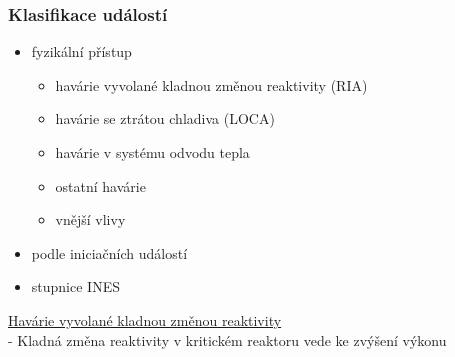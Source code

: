 \begin{comment}
\textit{Asi by bylo dobré zmínit, že hodnocení jaderné bezpečnosti provádíme buď deterministickými nebo pravděpodobnostními hodnoceními} \\

Deterministický přístup:
\begin{itemize}
    \item Definice iniciačních událostí - musím aplikovat specifické požadavky
    \item Určení dostupnosti SKK, okrajových a počátečních podmínek (jednoduchá porucha, zvládání nehody pouze bezpečnostními systémy)
    \item Výběr výpočetního kódu
    \item Zhodnocení výsledků
\end{itemize}
Pravděpodobnostní přístup:
\begin{itemize}
    \item vychází z deterministických analýz, ale beru v úvahu pravděpodobnost
    \item využívám při risk managementu, mám prst že se něco stane, mohu optimalizovat vůči přínosu
    \item CDF, prst úniku RA, prst účinku na veřejnost
\end{itemize}
\end{comment}


\subsubsection{Klasifikace událostí}
\begin{itemize}
	\item fyzikální přístup
	\begin{itemize}
		\item havárie vyvolané kladnou změnou reaktivity (RIA)
		\item havárie se ztrátou chladiva (LOCA)
		\item havárie v systému odvodu tepla
		\item ostatní havárie
		\item vnější vlivy
	\end{itemize}
	\item podle iniciačních událostí
	\item stupnice INES
\end{itemize}


\underline{Havárie vyvolané kladnou změnou reaktivity}
\\

\noindent - 	Kladná změna reaktivity v kritickém reaktoru vede ke zvýšení výkonu

